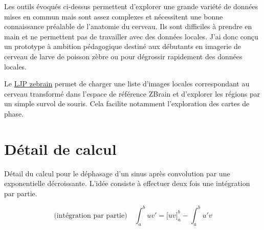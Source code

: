 Les outils évoqués ci-dessus permettent d'explorer une grande variété de données mises en commun mais sont assez complexes et nécessitent une bonne connaissance préalable de l'anatomie du cerveau. Ils sont difficiles à prendre en main et ne permettent pas de travailler avec des données locales. J'ai donc conçu un prototype à ambition pédagogique destiné aux débutants en imagerie de cerveau de larve de poisson zèbre ou pour dégrossir rapidement des données locales.

Le \href{https://github.com/LJPZebra/zebrain}{LJP zebrain} permet de charger une liste d'images locales correspondant au cerveau transformé dans l'espace de référence ZBrain et d'explorer les régions par un simple survol de souris. Cela facilite notamment l'exploration des cartes de phase.










\chapter{Détail de calcul}\label{calculdetail}

Détail du calcul pour le déphasage d'un sinus après convolution par une exponentielle décroissante. L'idée consiste à effectuer deux fois une intégration par partie.

$$
\text{(intégration par partie)} \quad \int_a^buv' = \Big[uv\Big]_a^b - \int_a^b u'v
$$

